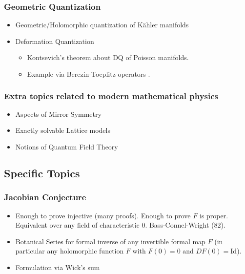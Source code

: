 \documentclass{article}
\begin{document}
\subsubsection*{Geometric Quantization}
\begin{itemize}
    \item Geometric/Holomorphic quantization of Kähler manifolds \cite{Schlichenmaier_2010}
    \item Deformation Quantization
    \begin{itemize}
        \item Kontsevich's theorem about DQ of Poisson manifolds. \cite{Kontsevich_2003}
        \item Example via Berezin-Toeplitz operators \cite{schlichenmaier1999deformationquantizationcompactkaehler}.
    \end{itemize}
\end{itemize}
\subsubsection*{Extra topics related to modern mathematical physics}
\begin{itemize}
    \item Aspects of Mirror Symmetry
    \item Exactly solvable Lattice models
    \item Notions of Quantum Field Theory
\end{itemize}
\clearpage
\subsection*{Specific Topics}

\subsubsection*{Jacobian Conjecture \cite{BCW}}
\begin{itemize}
    \item Enough to prove injective (many proofs). Enough to prove $F$ is proper. Equivalent over any field of characteristic 0. Bass-Connel-Wright (82).
    \item Botanical Series for formal inverse of any invertible formal map $F$ (in particular any holomorphic function $F$ with $F(0)=0$ and $DF(0)=\mathrm{Id}$).
    \item Formulation via Wick's sum \cite{Abdesselam}
\end{itemize}
\end{document}
